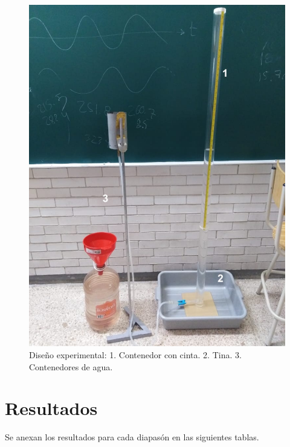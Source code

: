 \documentclass[10pt,a4paper]{article}
\begin{document}
\begin{figure}[H]
\includegraphics[scale=0.3]{esquema.jpeg}
\centering
\caption{Diseño experimental: 1. Contenedor con cinta. 2. Tina. 3. Contenedores de agua. }
\end{figure}









\section{Resultados}
Se anexan los resultados para cada diapasón en las siguientes tablas.
\end{document}

